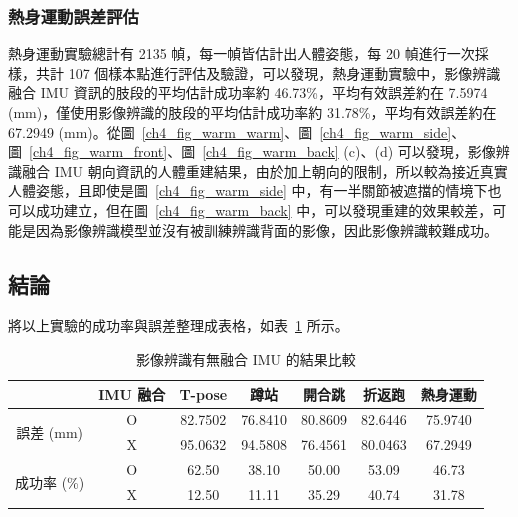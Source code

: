 \subsubsection*{熱身運動誤差評估}
熱身運動實驗總計有 2135 幀，每一幀皆估計出人體姿態，每 20 幀進行一次採樣，共計 107 個樣本點進行評估及驗證，可以發現，熱身運動實驗中，影像辨識融合 IMU 資訊的肢段的平均估計成功率約 46.73\%，平均有效誤差約在 7.5974 (mm)，僅使用影像辨識的肢段的平均估計成功率約 31.78\%，平均有效誤差約在 67.2949 (mm)。從圖~\ref{ch4_fig_warm_warm}、圖~\ref{ch4_fig_warm_side}、圖~\ref{ch4_fig_warm_front}、圖~\ref{ch4_fig_warm_back} (c)、(d) 可以發現，影像辨識融合 IMU 朝向資訊的人體重建結果，由於加上朝向的限制，所以較為接近真實人體姿態，且即使是圖~\ref{ch4_fig_warm_side} 中，有一半關節被遮擋的情境下也可以成功建立，但在圖~\ref{ch4_fig_warm_back} 中，可以發現重建的效果較差，可能是因為影像辨識模型並沒有被訓練辨識背面的影像，因此影像辨識較難成功。

\subsection{結論}
將以上實驗的成功率與誤差整理成表格，如表~\ref{ch4_tab_conclusion} 所示。
\begin{table}[ht!]
   \caption{影像辨識有無融合 IMU 的結果比較}
   \label{ch4_tab_conclusion}
   \centering
   \begin{tabular}{ccccccc}
   \toprule
    & IMU 融合 & T-pose & 蹲站 & 開合跳 & 折返跑 & 熱身運動 \\
   \midrule
   \multirow{2}{*}{誤差 (mm)} & O & 82.7502 & 76.8410 & 80.8609 & 82.6446 & 75.9740 \\
   & X & 95.0632 & 94.5808 & 76.4561 & 80.0463 & 67.2949 \\
   \midrule
   \multirow{2}{*}{成功率 (\%)} & O & 62.50 & 38.10 & 50.00 & 53.09 & 46.73 \\
   & X & 12.50 & 11.11 & 35.29 & 40.74 & 31.78 \\
   \bottomrule
   \end{tabular}
\end{table}

